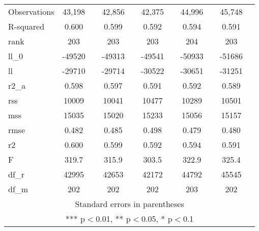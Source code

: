 \documentclass[]{article}
\begin{document}
\begin{tabular}{lcccccccccc}
Observations & 43,198 &  & 42,856 &  & 42,375 &  & 44,996 &  & 45,748 &  \\
R-squared & 0.600 &  & 0.599 &  & 0.592 &  & 0.594 &  & 0.591 &  \\
rank & 203 &  & 203 &  & 203 &  & 204 &  & 203 &  \\
ll\_0 & -49520 &  & -49313 &  & -49541 &  & -50933 &  & -51686 &  \\
ll & -29710 &  & -29714 &  & -30522 &  & -30651 &  & -31251 &  \\
r2\_a & 0.598 &  & 0.597 &  & 0.591 &  & 0.592 &  & 0.589 &  \\
rss & 10009 &  & 10041 &  & 10477 &  & 10289 &  & 10501 &  \\
mss & 15035 &  & 15020 &  & 15233 &  & 15056 &  & 15157 &  \\
rmse & 0.482 &  & 0.485 &  & 0.498 &  & 0.479 &  & 0.480 &  \\
r2 & 0.600 &  & 0.599 &  & 0.592 &  & 0.594 &  & 0.591 &  \\
F & 319.7 &  & 315.9 &  & 303.5 &  & 322.9 &  & 325.4 &  \\
df\_r & 42995 &  & 42653 &  & 42172 &  & 44792 &  & 45545 &  \\
 df\_m & 202 &  & 202 &  & 202 &  & 203 &  & 202 &  \\ \hline
\multicolumn{11}{c}{ Standard errors in parentheses} \\
\multicolumn{11}{c}{ *** p$<$0.01, ** p$<$0.05, * p$<$0.1} \\
\end{tabular}
\end{document}
